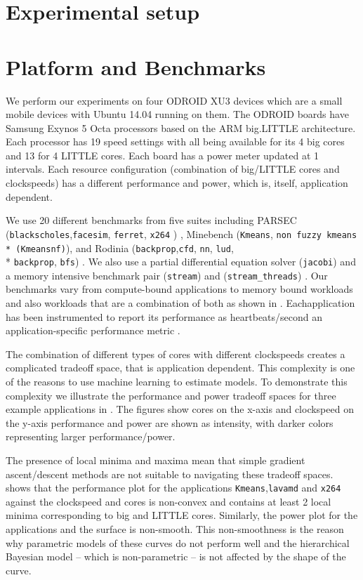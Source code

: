 \section{Experimental setup}

\section{Platform and Benchmarks}
We perform our experiments on four ODROID XU3 devices which are a
small mobile devices with Ubuntu 14.04 running on them. The ODROID
boards have Samsung Exynos 5 Octa processors based on the ARM
big.LITTLE architecture.  Each processor has 19 speed settings with
all being available for its 4 big cores and 13 for 4 LITTLE cores.
Each board has a power meter updated at 1 \ms intervals.  Each
resource configuration (combination of big/LITTLE cores and
clockspeeds) has a different performance and power, which is, itself,
application dependent.

We use 20 different benchmarks from five suites including PARSEC
(\texttt{blackscholes},\texttt{facesim}, \texttt{ferret},
\texttt{x264} ) \cite{parsec}, Minebench (\texttt{Kmeans}, \texttt{non
  fuzzy kmeans \\* (Kmeansnf)}), and Rodinia
(\texttt{backprop},\texttt{cfd}, \texttt{nn}, \texttt{lud}, \\*
\texttt{backprop}, \texttt{bfs}) \cite{rodinia}.  We also use a
partial differential equation solver (\texttt{jacobi}) and a memory
intensive benchmark pair (\texttt{stream}) and
(\texttt{stream\_threads}) \cite{stream}. Our benchmarks vary from
compute-bound applications to memory bound workloads and also
workloads that are a combination of both as shown in
.  Eachapplication has been instrumented
to report its performance as heartbeats/second an application-specific
performance metric \cite{POET}.

The combination of different types of cores with different clockspeeds
creates a complicated tradeoff space, that is application dependent.
This complexity is one of the reasons to use machine learning to
estimate models.  To demonstrate this complexity we illustrate the
performance and power tradeoff spaces for three example applications
in .  The figures show cores on the x-axis and
clockspeed on the y-axis performance and power are shown as intensity,
with darker colors representing larger performance/power.

The presence of local minima and maxima mean that simple gradient
ascent/descent methods are not suitable to navigating these tradeoff
spaces.  shows that the performance plot for the
applications \texttt{Kmeans},\texttt{lavamd} and \texttt{x264} against
the clockspeed and cores is non-convex and contains at least 2 local
minima corresponding to big and LITTLE cores.  Similarly, the power
plot for the applications and the surface is non-smooth.  This
non-smoothness is the reason why parametric models of these curves do
not perform well and the hierarchical Bayesian model -- which is
non-parametric -- is not affected by the shape of the curve.

